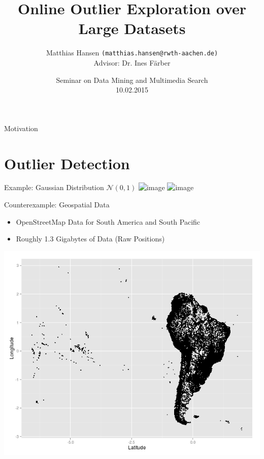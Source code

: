 \documentclass{beamer}
\title{Online Outlier Exploration over Large Datasets}
\author[Hansen]{Matthias Hansen \texttt{(matthias.hansen@rwth-aachen.de)} \\
        Advisor: Dr. Ines F\"arber}
\date{Seminar on Data Mining and Multimedia Search\\
        10.02.2015}
\institute{RWTH Aachen University}
\begin{document}
\frame{\titlepage}

\begin{frame}{Motivation}
\end{frame}
\section{Outlier Detection}
\begin{frame}{Example: Gaussian Distribution $\mathcal{N}(0,1)$}
    \centering
    \includegraphics<1>[width=.7\textwidth]{images/gaussian.png}
    \includegraphics<2>[width=.7\textwidth]{images/gaussian_lines.png}


\end{frame}
\begin{frame}{Counterexample: Geospatial Data}
    \begin{itemize}
        \item OpenStreetMap Data for South America and South Pacific
        \item Roughly 1.3 Gigabytes of Data (Raw Positions)

    \end{itemize}
    \begin{center}
    \includegraphics[width=.7\textwidth]{images/south_america.png} 
    \end{center}
\end{frame}
\end{document}
